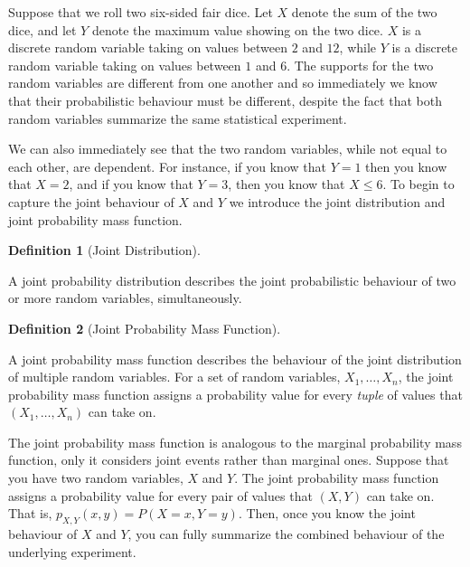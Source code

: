 \documentclass[
  letterpaper,
  DIV=11,
  numbers=noendperiod]{scrreprt}
\theoremstyle{definition}
\newtheorem{definition}{Definition}[chapter]
\theoremstyle{definition}
\theoremstyle{definition}
\theoremstyle{remark}
\begin{document}
Suppose that we roll two six-sided fair dice. Let \(X\) denote the sum
of the two dice, and let \(Y\) denote the maximum value showing on the
two dice. \(X\) is a discrete random variable taking on values between
\(2\) and \(12\), while \(Y\) is a discrete random variable taking on
values between \(1\) and \(6\). The supports for the two random
variables are different from one another and so immediately we know that
their probabilistic behaviour must be different, despite the fact that
both random variables summarize the same statistical experiment.

We can also immediately see that the two random variables, while not
equal to each other, are dependent. For instance, if you know that
\(Y=1\) then you know that \(X = 2\), and if you know that \(Y = 3\),
then you know that \(X \leq 6\). To begin to capture the joint behaviour
of \(X\) and \(Y\) we introduce the joint distribution and joint
probability mass function.

\begin{definition}[Joint
Distribution]\protect\hypertarget{def-joint-distribution}{}\label{def-joint-distribution}

A joint probability distribution describes the joint probabilistic
behaviour of two or more random variables, simultaneously.

\end{definition}

\begin{definition}[Joint Probability Mass
Function]\protect\hypertarget{def-joint-pmf}{}\label{def-joint-pmf}

A joint probability mass function describes the behaviour of the joint
distribution of multiple random variables. For a set of random
variables, \(X_1, \dots, X_n\), the joint probability mass function
assigns a probability value for every \emph{tuple} of values that
\((X_1,\dots,X_n)\) can take on.

\end{definition}

The joint probability mass function is analogous to the marginal
probability mass function, only it considers joint events rather than
marginal ones. Suppose that you have two random variables, \(X\) and
\(Y\). The joint probability mass function assigns a probability value
for every pair of values that \((X,Y)\) can take on. That is,
\(p_{X,Y}(x,y) = P(X = x, Y = y)\). Then, once you know the joint
behaviour of \(X\) and \(Y\), you can fully summarize the combined
behaviour of the underlying experiment.
\end{document}
